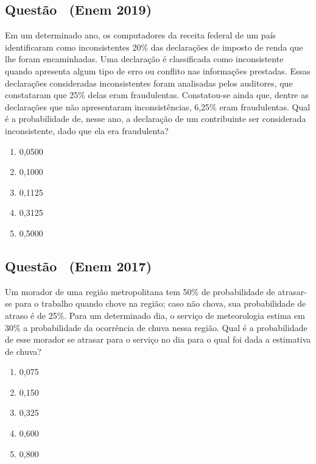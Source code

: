 \documentclass[12pt]{article}
\newcounter{questao}
\newcommand{\novaquestao}[1]{%
  \stepcounter{questao}%
  \subsection*{Questão \thequestao\ (#1)}%
}
\begin{document}
\begin{multicols}{2}
        \novaquestao{Enem 2019}

            Em um determinado ano, os computadores da receita federal de um país identificaram 
            como inconsistentes 20\% das declarações de imposto de renda que lhe foram 
            encaminhadas. Uma declaração é classificada como inconsistente quando apresenta 
            algum tipo de erro ou conflito nas informações prestadas. Essas declarações 
            consideradas inconsistentes foram analisadas pelos auditores, que constataram 
            que 25\% delas eram fraudulentas. Constatou-se ainda que, dentre as declarações 
            que não apresentaram inconsistências, 6,25\% eram fraudulentas. Qual é a probabilidade 
            de, nesse ano, a declaração de um contribuinte ser considerada inconsistente, dado 
            que ela era fraudulenta?

            \begin{enumerate}[label=(\alph*), noitemsep]
                \item 0,0500
                \item 0,1000
                \item 0,1125
                \item 0,3125
                \item 0,5000
            \end{enumerate}
        
        \novaquestao{Enem 2017}

            Um morador de uma região metropolitana tem 50\% de probabilidade de atrasar-se 
            para o trabalho quando chove na região; caso não chova, sua probabilidade de 
            atraso é de 25\%. Para um determinado dia, o serviço de meteorologia estima em 
            30\% a probabilidade da ocorrência de chuva nessa região. Qual é a probabilidade 
            de esse morador se atrasar para o serviço no dia para o qual foi dada a 
            estimativa de chuva?

            \begin{enumerate}[label=(\alph*), noitemsep]
                \item 0,075
                \item 0,150
                \item 0,325
                \item 0,600
                \item 0,800
            \end{enumerate}
        

\end{multicols}
\end{document}
